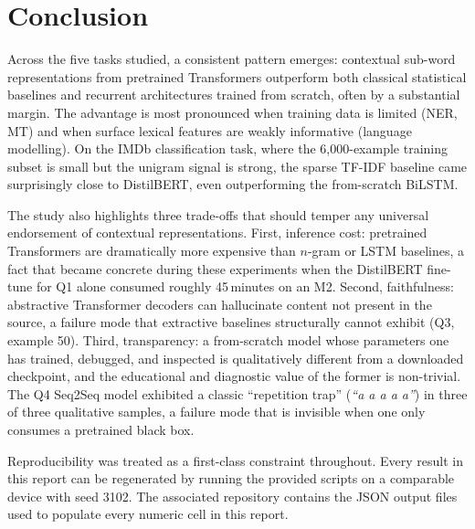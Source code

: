 \documentclass[11pt,a4paper]{article}
\begin{document}
\section{Conclusion}

Across the five tasks studied, a consistent pattern emerges:
contextual sub-word representations from pretrained Transformers
outperform both classical statistical baselines and recurrent
architectures trained from scratch, often by a substantial margin.
The advantage is most pronounced when training data is limited
(NER, MT) and when surface lexical features are weakly informative
(language modelling). On the IMDb classification task, where the
6{,}000-example training subset is small but the unigram signal is
strong, the sparse TF-IDF baseline came surprisingly close to
DistilBERT, even outperforming the from-scratch BiLSTM.

The study also highlights three trade-offs that should temper any
universal endorsement of contextual representations. First,
inference cost: pretrained Transformers are dramatically more
expensive than $n$-gram or LSTM baselines, a fact that became
concrete during these experiments when the DistilBERT fine-tune for
Q1 alone consumed roughly 45\,minutes on an M2. Second,
faithfulness: abstractive Transformer decoders can hallucinate
content not present in the source, a failure mode that extractive
baselines structurally cannot exhibit (Q3, example 50). Third,
transparency: a from-scratch model whose parameters one has
trained, debugged, and inspected is qualitatively different from a
downloaded checkpoint, and the educational and diagnostic value of
the former is non-trivial. The Q4 Seq2Seq model exhibited a
classic ``repetition trap'' (\textit{``a a a a a''}) in three of
three qualitative samples, a failure mode that is invisible when
one only consumes a pretrained black box.

Reproducibility was treated as a first-class constraint throughout.
Every result in this report can be regenerated by running the
provided scripts on a comparable device with seed 3102. The
associated repository contains the JSON output files used to
populate every numeric cell in this report.

\newpage


\end{document}

